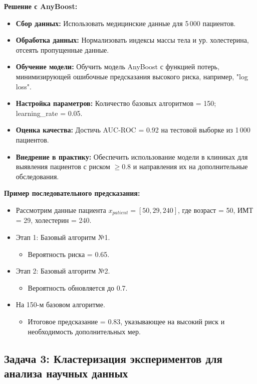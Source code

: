 \textbf{Решение с AnyBoost:}
\begin{itemize}
    \item \textbf{Сбор данных:} Использовать медицинские данные для 5\,000 пациентов. 
    \item \textbf{Обработка данных:} Нормализовать индексы массы тела и ур. холестерина, отсеять пропущенные данные.
    \item \textbf{Обучение модели:} Обучить модель AnyBoost с функцией потерь, минимизирующей ошибочные предсказания высокого риска, например, "log loss".
    \item \textbf{Настройка параметров:} Количество базовых алгоритмов = 150; learning\_rate = 0.05.
    \item \textbf{Оценка качества:} Достичь AUC-ROC = 0.92 на тестовой выборке из 1\,000 пациентов.
    \item \textbf{Внедрение в практику:} Обеспечить использование модели в клиниках для выявления пациентов с риском $\geq 0.8$ и направления их на дополнительные обследования.
\end{itemize}

\textbf{Пример последовательного предсказания:}
\begin{itemize}
    \item Рассмотрим данные пациента $x_{patient} = [50, 29, 240]$, где возраст = 50, ИМТ = 29, холестерин = 240.
    \item Этап 1: Базовый алгоритм №1.
        \begin{itemize}
            \item Вероятность риска = 0.65.
        \end{itemize}
    \item Этап 2: Базовый алгоритм №2.
        \begin{itemize}
            \item Вероятность обновляется до 0.7.
        \end{itemize}
    \item На 150-м базовом алгоритме.
        \begin{itemize}
            \item Итоговое предсказание = 0.83, указывающее на высокий риск и необходимость дополнительных мер.
        \end{itemize}
\end{itemize}


\subsection*{Задача 3: Кластеризация экспериментов для анализа научных данных}

